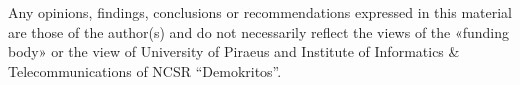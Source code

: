 \vspace{1cm}

\begin{flushleft}
    Any opinions, findings, conclusions or recommendations expressed in this material are those of the author(s) and do not necessarily reflect the views of the «funding body» or the view of University of Piraeus and Institute of Informatics \& Telecommunications of NCSR “Demokritos”. 
\end{flushleft}